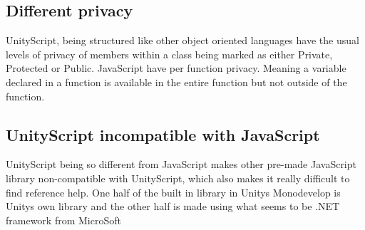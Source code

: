\subsection {Different privacy}
UnityScript, being structured like other object oriented languages have the usual levels of privacy of members within a class being marked as either Private, Protected or Public. JavaScript have per function privacy. Meaning a variable declared in a function is available in the entire function but not outside of the function.
%

\subsection {UnityScript incompatible with JavaScript}
UnityScript being so different from JavaScript makes other pre-made JavaScript library non-compatible with UnityScript, which also makes it really difficult to find reference help. One half of the built in library in Unitys Monodevelop is Unitys own library and the other half is made using what seems to be .NET framework from MicroSoft